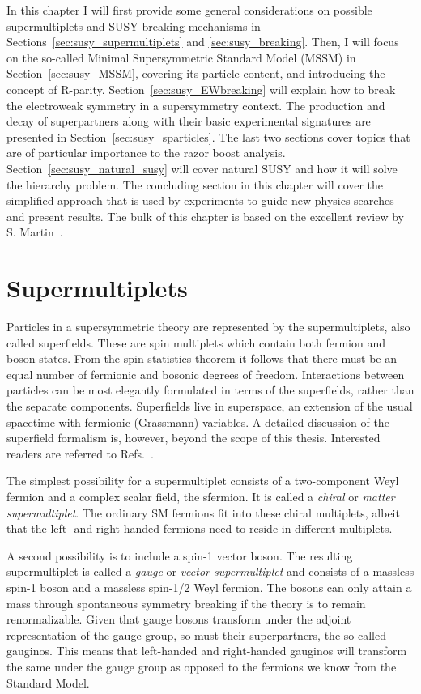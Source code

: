 In this chapter I will first provide some general considerations on possible supermultiplets and
SUSY breaking mechanisms in Sections~\ref{sec:susy_supermultiplets} and \ref{sec:susy_breaking}. 
Then, I will focus on the so-called Minimal Supersymmetric Standard Model (MSSM) in
Section~\ref{sec:susy_MSSM}, covering its particle content, and introducing the concept of
R-parity. Section~\ref{sec:susy_EWbreaking} will explain how to break the electroweak symmetry in
a supersymmetry context. The production and decay of superpartners along with their basic
experimental signatures are presented in Section~\ref{sec:susy_sparticles}. 
The last two sections cover topics that are of particular importance to the razor boost analysis. 
Section~\ref{sec:susy_natural_susy} will cover natural SUSY and how it will solve the hierarchy
problem. The concluding section in this chapter will cover the simplified approach that is
used by experiments to guide new physics searches and present results. 
The bulk of this chapter is based on the excellent review by S. Martin~\cite{Martin:1997ns}. 

\section{Supermultiplets \label{sec:susy_supermultiplets}}

Particles in a supersymmetric theory are represented by the supermultiplets, also called
superfields. These are spin multiplets which contain both fermion and boson states. From the
spin-statistics theorem it follows that there must be an equal number of fermionic and bosonic
degrees of freedom. 
Interactions between particles can be most elegantly formulated in terms of the superfields, rather
than the separate components. Superfields live in superspace, an extension of the
usual spacetime with fermionic (Grassmann) variables. A detailed discussion of the superfield
formalism is, however, beyond the scope of this thesis. Interested readers are referred to
Refs.~\cite{Martin:1997ns,Polonsky:2001pn}. 

The simplest possibility for a supermultiplet consists of a two-component Weyl fermion and a complex
scalar field, the sfermion. It is called a \textit{chiral} or \textit{matter supermultiplet}. The
ordinary SM fermions fit into these chiral multiplets, albeit that the left- and right-handed
fermions need to reside in different multiplets. 

A second possibility is to include a spin-1 vector boson. The resulting supermultiplet is
called a \textit{gauge} or \textit{vector supermultiplet} and consists of a massless spin-1 boson
and a massless spin-1/2 Weyl fermion. The bosons can only attain a mass through spontaneous
symmetry breaking if the theory is to remain renormalizable. 
Given that gauge bosons transform under the adjoint representation of the gauge
group, so must their superpartners, the so-called gauginos. This means that left-handed and
right-handed gauginos will transform the same under the gauge group as opposed to the fermions we
know from the Standard Model. 

